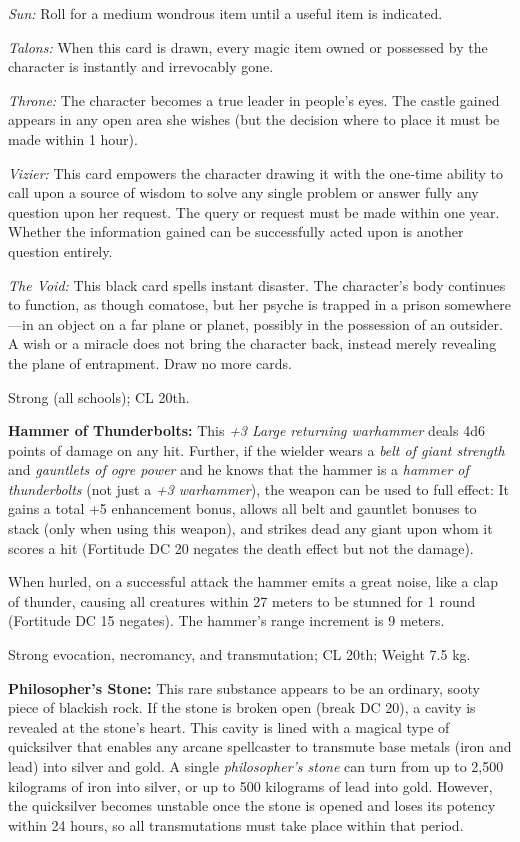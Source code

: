 \textit{Sun:} Roll for a medium wondrous item until a useful item is indicated.

\textit{Talons:} When this card is drawn, every magic item owned or possessed by the character is instantly and irrevocably gone.

\textit{Throne:} The character becomes a true leader in people's eyes. The castle gained appears in any open area she wishes (but the decision where to place it must be made within 1 hour).

\textit{Vizier:} This card empowers the character drawing it with the one-time ability to call upon a source of wisdom to solve any single problem or answer fully any question upon her request. The query or request must be made within one year. Whether the information gained can be successfully acted upon is another question entirely.

\textit{The Void:} This black card spells instant disaster. The character's body continues to function, as though comatose, but her psyche is trapped in a prison somewhere---in an object on a far plane or planet, possibly in the possession of an outsider. A wish or a miracle does not bring the character back, instead merely revealing the plane of entrapment. Draw no more cards.

Strong (all schools); CL 20th.

\textbf{Hammer of Thunderbolts:} This \emph{+3 Large returning warhammer} deals 4d6 points of damage on any hit. Further, if the wielder wears a \emph{belt of giant strength} and \emph{gauntlets of ogre power} and he knows that the hammer is a \emph{hammer of thunderbolts} (not just a \emph{+3 warhammer}), the weapon can be used to full effect: It gains a total +5 enhancement bonus, allows all belt and gauntlet bonuses to stack (only when using this weapon), and strikes dead any giant upon whom it scores a hit (Fortitude DC 20 negates the death effect but not the damage).

When hurled, on a successful attack the hammer emits a great noise, like a clap of thunder, causing all creatures within 27 meters to be stunned for 1 round (Fortitude DC 15 negates). The hammer's range increment is 9 meters.

Strong evocation, necromancy, and transmutation; CL 20th; Weight 7.5 kg.

\textbf{Philosopher's Stone:} This rare substance appears to be an ordinary, sooty piece of blackish rock. If the stone is broken open (break DC 20), a cavity is revealed at the stone's heart. This cavity is lined with a magical type of quicksilver that enables any arcane spellcaster to transmute base metals (iron and lead) into silver and gold. A single \emph{philosopher's stone} can turn from up to 2,500 kilograms of iron into silver, or up to 500 kilograms of lead into gold. However, the quicksilver becomes unstable once the stone is opened and loses its potency within 24 hours, so all transmutations must take place within that period.


